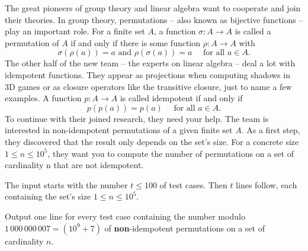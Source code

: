 The great pioneers of group theory and linear algebra want to cooperate and join their theories.
In group theory, permutations -- also known as bijective functions -- play an important role.
For a finite set $A$, a function $\sigma : A \rightarrow A$ is called a permutation of $A$ if and only if there is some function $
\rho : A → A$ with
$$\sigma(\rho(a)) = a\text{ and }\rho(\sigma(a)) = a \quad \text{ for all }a \in A\text{.}$$
The other half of the new team -- the experts on linear algebra -- deal a lot with idempotent functions.
They appear as projections when computing shadows in 3D games or as closure operators like the transitive closure, just to name a few examples.
A function $p : A \rightarrow A$ is called idempotent if and only if
$$p(p(a)) = p(a) \quad \text{ for all }a \in A\text{.}$$
To continue with their joined research, they need your help.
The team is interested in non-idempotent permutations of a given finite set $A$.
As a first step, they discovered that the result only depends on the set's size.
For a concrete size $1 \leq n \leq 10^5$, they want you to compute the number of permutations on a set of cardinality n that are not idempotent.
\begin{Input}
    The input starts with the number $t \leq 100$ of test cases.
    Then $t$ lines follow, each containing the set's size $1 \leq n \leq 10^5$.
\end{Input}

\begin{Output}
    Output one line for every test case containing the number modulo $1\,000\,000\,007 = (10^9 + 7)$ of \textbf{non}-idempotent permutations on a set of cardinality $n$.
\end{Output}
